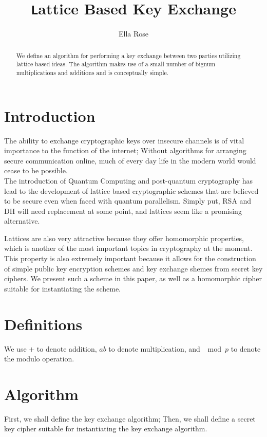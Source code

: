 \documentclass[preprint]{iacrtrans}
\author{Ella Rose\inst{1}}
\institute{Paso Robles, CA \email{python_pride@protonmail.com}}
\title[\texttt Lattice Based Key Exchange]{\texttt Lattice Based Key Exchange}
\begin{document}
\maketitle


\begin{abstract}
  We define an algorithm for performing a key exchange between two parties utilizing lattice based ideas. The algorithm makes use of a small number of bignum multiplications and additions and is conceptually simple.\\ 
\end{abstract}

\todototoc
\listoftodos

\section{Introduction}
 The ability to exchange cryptographic keys over insecure channels is of vital importance to the function of the internet; Without algorithms for arranging secure communication online, much of every day life in the modern world would cease to be possible.\\

The introduction of Quantum Computing and post-quantum cryptography has lead to the development of lattice based cryptographic schemes that are believed to be secure even when faced with quantum parallelism. Simply put, RSA and DH will need replacement at some point, and lattices seem like a promising alternative.

Lattices are also very attractive because they offer homomorphic properties, which is another of the most important topics in cryptography at the moment. This property is also extremely important because it allows for the construction of simple public key encryption schemes and key exchange shemes from secret key ciphers. We present such a scheme in this paper, as well as a homomorphic cipher suitable for instantiating the scheme.

\section{Definitions}
We use $+$ to denote addition, $ab$ to denote multiplication, and $\mod p$ to denote the modulo operation.

\section{Algorithm}
First, we shall define the key exchange algorithm; Then, we shall define a secret key cipher suitable for instantiating the key exchange algorithm.
\end{document}
